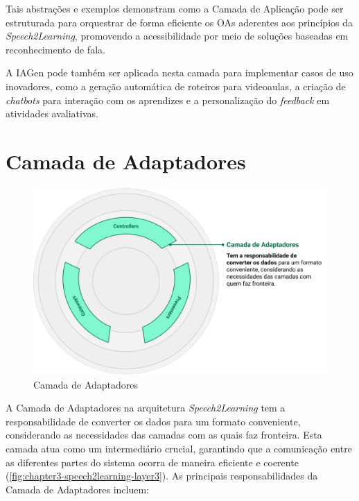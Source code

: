 Tais abstrações e exemplos demonstram como a Camada de Aplicação pode ser estruturada para orquestrar de forma eficiente os OAs aderentes aos princípios da \textit{Speech2Learning}, promovendo a acessibilidade por meio de soluções baseadas em reconhecimento de fala.

A IAGen pode também ser aplicada nesta camada para implementar casos de uso inovadores, como a geração automática de roteiros para videoaulas, a criação de \textit{chatbots} para interação com os aprendizes e a personalização do \textit{feedback} em atividades avaliativas.

\section{Camada de Adaptadores}

\begin{figure}[htb]
\centering
\caption{Camada de Adaptadores}
\label{fig:chapter3-speech2learning-layer3}
\includegraphics[width=.95\textwidth]{images/chapter3-speech2learning-layer3.png}
\end{figure}

A Camada de Adaptadores na arquitetura \textit{Speech2Learning} tem a responsabilidade de converter os dados para um formato conveniente, considerando as necessidades das camadas com as quais faz fronteira. Esta camada atua como um intermediário crucial, garantindo que a comunicação entre as diferentes partes do sistema ocorra de maneira eficiente e coerente (\autoref{fig:chapter3-speech2learning-layer3}). As principais responsabilidades da Camada de Adaptadores incluem:

